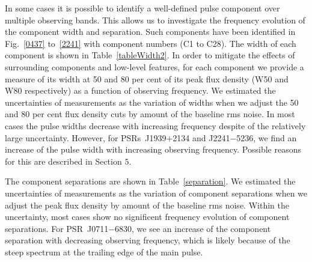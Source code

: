 \documentclass[useAMS,usenatbib]{mn2e}
\begin{document}
In some cases it is possible to identify a well-defined pulse component over multiple 
observing bands. This allows us to investigate the frequency evolution of the 
component width and separation. 
%
Such components have been identified in Fig.~\ref{0437} to~\ref{2241} with component 
numbers (C1 to C28).  
%
The width of each component is shown in Table~\ref{tableWidth2}.  
In order to mitigate the effects of surrounding components and low-level features, for
each component we provide a measure of its width at 50 and 80 per cent of its 
peak flux density (W50 and W80 respectively) as a function of observing frequency.
%
We estimated the uncertainties of measurements as the variation of widths when we 
adjust the 50 and 80 per cent flux density cuts by amount of the baseline rms noise.
%
In most cases the pulse widths decrease with increasing frequency despite of the 
relatively large uncertainty. 
%
However, for PSRs~J1939$+$2134 and J2241$-$5236, we find an increase of the pulse 
width with increasing observing frequency. Possible reasons for this are described 
in Section $5$.
%

The component separations are shown in Table~\ref{separation}. We estimated the 
uncertainties of measurements as the variation of component separations when we 
adjust the peak flux density by amount of the baseline rms noise.
%
Within the uncertainty, most cases show no significent frequency evolution of 
component separations. For PSR~J0711$-$6830, we see an increase of the component 
separation with decreasing observing frequency, which is likely because of the 
steep spectrum at the trailing edge of the main pulse.
%
\end{document}
